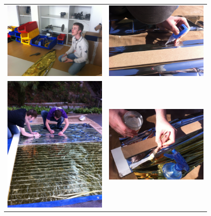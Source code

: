 \begin{frame}
	\begin{tabular}{cc}
		\includegraphics[width=5cm]{../Images/assen_0.JPG} & \includegraphics[width=5cm]{../Images/assen_1.JPG} \\
		\includegraphics[width=5cm]{../Images/assen_2.JPG} & \includegraphics[width=5cm]{../Images/assen_3.JPG} \\
	\end{tabular}

\end{frame}


